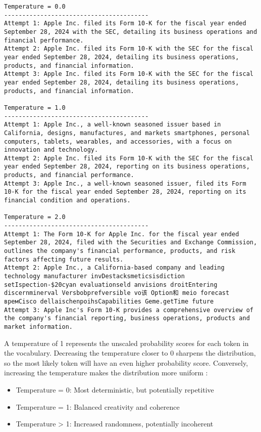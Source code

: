     
\begin{verbatim}
Temperature = 0.0
----------------------------------------
Attempt 1: Apple Inc. filed its Form 10-K for the fiscal year ended September 28, 2024 with the SEC, detailing its business operations and financial performance.
Attempt 2: Apple Inc. filed its Form 10-K with the SEC for the fiscal year ended September 28, 2024, detailing its business operations, products, and financial information.
Attempt 3: Apple Inc. filed its Form 10-K with the SEC for the fiscal year ended September 28, 2024, detailing its business operations, products, and financial information.

Temperature = 1.0
----------------------------------------
Attempt 1: Apple Inc., a well-known seasoned issuer based in California, designs, manufactures, and markets smartphones, personal computers, tablets, wearables, and accessories, with a focus on innovation and technology.
Attempt 2: Apple Inc. filed its Form 10-K with the SEC for the fiscal year ended September 28, 2024, reporting on its business operations, products, and financial performance.
Attempt 3: Apple Inc., a well-known seasoned issuer, filed its Form 10-K for the fiscal year ended September 28, 2024, reporting on its financial condition and operations.

Temperature = 2.0
----------------------------------------
Attempt 1: The Form 10-K for Apple Inc. for the fiscal year ended September 28, 2024, filed with the Securities and Exchange Commission, outlines the company's financial performance, products, and risk factors affecting future results.
Attempt 2: Apple Inc., a California-based company and leading technology manufacturer invDestacksmeticsisdiction setIspection-$20cyan evaluationseld anvisions droitEntering discernminerval Versbobprefversible vo该 Option和 meio forecast времCisco dellaischenpoihsCapabilities Geme.getTime future
Attempt 3: Apple Inc's Form 10-K provides a comprehensive overview of the company's financial reporting, business operations, products and market information.
\end{verbatim}

A temperature of 1 represents the unscaled probability scores for each token in the vocabulary. Decreasing the temperature closer to 0 sharpens the distribution, so the most likely token will have an even higher probability score. Conversely, increasing the temperature makes the distribution more uniform :
\begin{itemize}
    \item Temperature = 0: Most deterministic, but potentially repetitive
    \item Temperature = 1: Balanced creativity and coherence 
    \item Temperature > 1: Increased randomness, potentially incoherent
\end{itemize}

